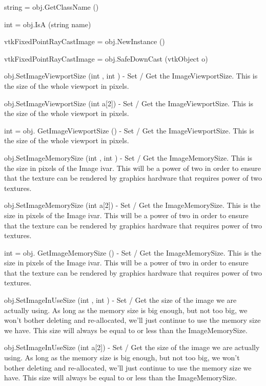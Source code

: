 \begin{DoxyItemize}
\item {\ttfamily string = obj.\-Get\-Class\-Name ()}  
\item {\ttfamily int = obj.\-Is\-A (string name)}  
\item {\ttfamily vtk\-Fixed\-Point\-Ray\-Cast\-Image = obj.\-New\-Instance ()}  
\item {\ttfamily vtk\-Fixed\-Point\-Ray\-Cast\-Image = obj.\-Safe\-Down\-Cast (vtk\-Object o)}  
\item {\ttfamily obj.\-Set\-Image\-Viewport\-Size (int , int )} -\/ Set / Get the Image\-Viewport\-Size. This is the size of the whole viewport in pixels.  
\item {\ttfamily obj.\-Set\-Image\-Viewport\-Size (int a\mbox{[}2\mbox{]})} -\/ Set / Get the Image\-Viewport\-Size. This is the size of the whole viewport in pixels.  
\item {\ttfamily int = obj. Get\-Image\-Viewport\-Size ()} -\/ Set / Get the Image\-Viewport\-Size. This is the size of the whole viewport in pixels.  
\item {\ttfamily obj.\-Set\-Image\-Memory\-Size (int , int )} -\/ Set / Get the Image\-Memory\-Size. This is the size in pixels of the Image ivar. This will be a power of two in order to ensure that the texture can be rendered by graphics hardware that requires power of two textures.  
\item {\ttfamily obj.\-Set\-Image\-Memory\-Size (int a\mbox{[}2\mbox{]})} -\/ Set / Get the Image\-Memory\-Size. This is the size in pixels of the Image ivar. This will be a power of two in order to ensure that the texture can be rendered by graphics hardware that requires power of two textures.  
\item {\ttfamily int = obj. Get\-Image\-Memory\-Size ()} -\/ Set / Get the Image\-Memory\-Size. This is the size in pixels of the Image ivar. This will be a power of two in order to ensure that the texture can be rendered by graphics hardware that requires power of two textures.  
\item {\ttfamily obj.\-Set\-Image\-In\-Use\-Size (int , int )} -\/ Set / Get the size of the image we are actually using. As long as the memory size is big enough, but not too big, we won't bother deleting and re-\/allocated, we'll just continue to use the memory size we have. This size will always be equal to or less than the Image\-Memory\-Size.  
\item {\ttfamily obj.\-Set\-Image\-In\-Use\-Size (int a\mbox{[}2\mbox{]})} -\/ Set / Get the size of the image we are actually using. As long as the memory size is big enough, but not too big, we won't bother deleting and re-\/allocated, we'll just continue to use the memory size we have. This size will always be equal to or less than the Image\-Memory\-Size.  

\end{DoxyItemize}
